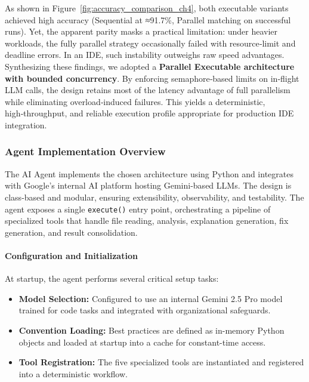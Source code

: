 \begin{spacing}{1.2}
As shown in Figure~\ref{fig:accuracy_comparison_ch4}, both executable variants achieved high accuracy (Sequential at ≈91.7\%, Parallel matching on successful runs). Yet, the apparent parity masks a practical limitation: under heavier workloads, the fully parallel strategy occasionally failed with resource‑limit and deadline errors. In an IDE, such instability outweighs raw speed advantages.\\

Synthesizing these findings, we adopted a \textbf{Parallel Executable architecture with bounded concurrency}. By enforcing semaphore‑based limits on in‑flight LLM calls, the design retains most of the latency advantage of full parallelism while eliminating overload‑induced failures. This yields a deterministic, high‑throughput, and reliable execution profile appropriate for production IDE integration.

\subsubsection{Agent Implementation Overview}
The AI Agent implements the chosen architecture using Python and integrates with Google’s internal AI platform 
hosting Gemini-based LLMs. The design is class-based and modular, ensuring extensibility, observability, and testability.  
The agent exposes a single \texttt{execute()} entry point, orchestrating a pipeline of specialized tools that handle 
file reading, analysis, explanation generation, fix generation, and result consolidation.

\paragraph{Configuration and Initialization}
At startup, the agent performs several critical setup tasks:
\begin{itemize}
    \item \textbf{Model Selection:} Configured to use an internal Gemini 2.5 Pro model trained for code tasks and integrated with organizational safeguards.
    \item \textbf{Convention Loading:} Best practices are defined as in-memory Python objects and loaded at startup into a cache for constant-time access.
    \item \textbf{Tool Registration:} The five specialized tools are instantiated and registered into a deterministic workflow.
\end{itemize}


\end{spacing}
